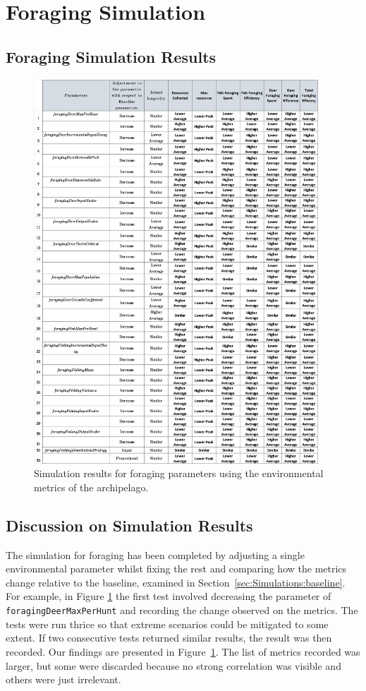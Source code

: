 \section{Foraging Simulation}
\subsection{Foraging Simulation Results}
\begin{figure}[!htb]
    \centering
    \includegraphics[width=0.95\textwidth]{16_results_and_eval/images/ForageCommonSim.png}
    \caption{Simulation results for foraging parameters using the environmental metrics of the archipelago.}
    \label{fig:Resource}
\end{figure}
\subsection{Discussion on Simulation Results}
The simulation for foraging has been completed by adjusting a single environmental parameter whilst fixing the rest and comparing how the metrics change relative to the baseline, examined in Section~\ref{sec:Simulations:baseline}. For example, in Figure \ref{fig:Resource} the first test involved decreasing the parameter of \texttt{foragingDeerMaxPerHunt} and recording the change observed on the metrics. The tests were run thrice so that extreme scenarios could be mitigated to some extent. If two consecutive tests returned similar results, the result was then recorded. Our findings are presented in Figure~\ref{fig:Resource}. The list of metrics recorded was larger, but some were discarded because no strong correlation was visible and others were just irrelevant. 

